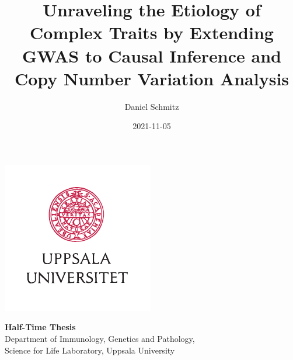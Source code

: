 \documentclass[twoside=false]{scrbook}
\title{Unraveling the Etiology of Complex Traits by Extending GWAS to Causal Inference and Copy Number Variation Analysis}
\author{Daniel Schmitz}
\date{2021-11-05}
\begin{document}
\frontmatter
\newlength{\oldparindent}
\setlength{\oldparindent}{\parindent}

\parskip 6pt
\parindent 0pt

\begin{titlepage}
    \centering
    \makeatletter
    \Huge \sffamily \@title

    \Large \rmfamily \@author

    \vspace*{\fill}
    \includegraphics[width=.5\pagewidth]{img/UU_logo_4f_42.pdf}

    \vspace*{\fill}
    \normalsize
    \textbf{Half-Time Thesis} \\
    Department of Immunology, Genetics and Pathology,\\
    Science for Life Laboratory, Uppsala University

    \@date
    \makeatother
\end{titlepage}
\end{document}
